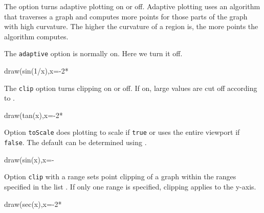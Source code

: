 The  option turns adaptive plotting on or off.
Adaptive plotting uses an algorithm that traverses a graph and computes
more points for those parts of the graph with high curvature.
The higher the curvature of a region is, the more points the algorithm
computes.
%
%
\begin{psXtc}
\begin{xtccomment}
The {\tt adaptive} option is normally on.
Here we turn it off.
\end{xtccomment}
\begin{spadsrc}
draw(sin(1/x),x=-2*%
\end{spadsrc}
\end{psXtc}
%
%
\begin{psXtc}
\begin{xtccomment}
The {\tt clip} option turns clipping on or off.
If on, large values are cut off according to
.
\end{xtccomment}
\begin{spadsrc}
draw(tan(x),x=-2*%
\end{spadsrc}
\end{psXtc}
%
%
\begin{psXtc}
\begin{xtccomment}
Option {\tt toScale} does plotting to scale if {\tt true} or uses
the entire viewport if {\tt false}.
The default can be determined using
.
\end{xtccomment}
\begin{spadsrc}
draw(sin(x),x=-%
\end{spadsrc}
\end{psXtc}
%
%
\begin{psXtc}
\begin{xtccomment}
Option {\tt clip} with a range sets point clipping of a graph within the
ranges specified in the list .
If only one range is specified, clipping applies to the y-axis.
\end{xtccomment}
\begin{spadsrc}
draw(sec(x),x=-2*%
\end{spadsrc}
\end{psXtc}
